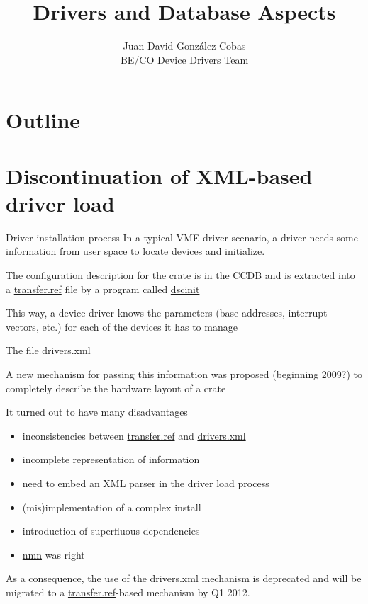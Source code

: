 \documentclass[compress,red]{beamer}
\title{Drivers and Database Aspects}
\author{Juan David Gonz\'alez Cobas\\
	BE/CO Device Drivers Team}
\begin{document}
\begin{frame}
\titlepage
\end{frame}

\section*{Outline}
\begin{frame}
\tableofcontents
\end{frame}

\section{Discontinuation of XML-based driver load}

\begin{frame}{Driver installation process}
In a typical VME driver scenario, a driver needs some information from
user space to locate devices and initialize.

\pause
The configuration description for the crate is in the CCDB and is
extracted into a \url{transfer.ref} file by a program called
\url{dscinit}

\pause
This way, a device driver knows the parameters (base addresses,
interrupt vectors, etc.) for each of the devices it has to manage
\end{frame}

\begin{frame}{The file \url{drivers.xml}}

A new mechanism for passing this information was proposed
(beginning 2009?) to completely describe the hardware layout of a crate

\pause
It turned out to have many disadvantages

\pause
\begin{itemize}
\item inconsistencies between \url{transfer.ref} and \url{drivers.xml}
\item incomplete representation of information
\item need to embed an XML parser in the driver load process
\item (mis)implementation of a complex install
\item introduction of superfluous dependencies
\item \url{nmn} was right
\end{itemize}

\pause
As a consequence, the use of the \url{drivers.xml} mechanism is
deprecated and will be migrated to a \url{transfer.ref}-based
mechanism by Q1 2012.
\end{frame}
\end{document}
